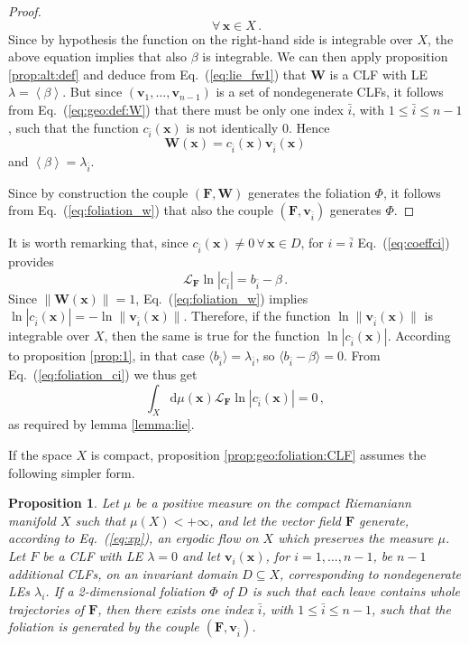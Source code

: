 \documentclass{article}
\theoremstyle{plain}
\newtheorem{proposition}[theorem]{Proposition}
\theoremstyle{definition}
\theoremstyle{remark}
\newcommand{\vect}[1]{\boldsymbol{#1}}
\begin{document}
\begin{proof}
\begin{equation}
\ \forall\, \vect{x}\in X\,.
\end{equation}
Since by hypothesis the function on the right-hand side
is integrable over $X$, the above equation
implies that also $\beta$ is integrable. We can then apply proposition
\ref{prop:alt:def} and deduce from Eq.~(\ref{eq:lie_fw1}) that
$\vect{W}$ is a CLF with LE $\lambda=\left<\beta\right>$. But since 
$\left(\vect{v}_1, \dots, \vect{v}_{n-1}\right)$ is a
set of nondegenerate CLFs, it follows from Eq.~(\ref{eq:geo:def:W})
that there must be only one index $\bar i$,
with $1\leq \bar i\leq n-1$, such that the function $c_{\bar i} (\vect{x})$
is not identically 0. Hence 
\begin{equation} \label{eq:foliation_w}
    \vect{W}(\vect{x}) = c_{\bar i} (\vect{x})
\vect{v}_{\bar i} (\vect{x})
  \end{equation}
and $\left<\beta\right>=\lambda_{\bar i}$. 

Since by construction the couple $(\vect{F},\vect{W})$ generates the
foliation $\Phi$, it follows from Eq.~(\ref{eq:foliation_w}) that
also the couple $(\vect{F},\vect{v}_{\bar i})$ generates $\Phi$.
\end{proof}

It is worth remarking that,
since $c_{\bar i} (\vect{x})\neq 0\,\forall\,\vect x\in D$, for $i=\bar i$
Eq.~(\ref{eq:coeffci}) provides
 \begin{equation}\label{eq:foliation_ci}
  \mathcal{L}_{\vect{F}}\ln |c_{\bar i}|=b_{\bar i}-\beta\,.
  \end{equation}
Since $\lVert \vect{W}(\vect{x})\rVert =1$,
Eq.~(\ref{eq:foliation_w}) implies $\ln|c_{\bar i}(\vect{x})|=
-\ln \lVert \vect{v}_{\bar i}(\vect{x})\rVert$. Therefore, 
if the function $\ln \lVert \vect{v}_{\bar i}(\vect{x})\rVert$ is integrable 
over $X$, then the same is true for the function $\ln|c_{\bar i}(\vect{x})|$.
According to proposition \ref{prop:1}, in that case
$\langle b_{\bar i}\rangle=\lambda_{\bar i}$, so 
$\langle b_{\bar i}-\beta\rangle=0$. From
Eq.~(\ref{eq:foliation_ci}) we thus get
\[
\int_X \mathrm{d}\mu(\vect{x}) \mathcal{L}_{\vect{F}}
\ln |c_{\bar i}(\vect{x})|=0\,,
\]
as required by lemma \ref{lemma:lie}.

If the space $X$ is compact, proposition \ref{prop:geo:foliation:CLF}
assumes the following simpler form.

\begin{proposition} \label{prop:geo:foliation:CLF2}
Let $\mu$ be a positive measure on the compact Riemaniann manifold $X$
such that $\mu(X)<+\infty$, and
let the vector field $\vect{F}$ generate, according to Eq.~(\ref{eq:xp}), 
an ergodic flow on $X$ which preserves the measure $\mu$.
Let $F$ be a CLF with LE $\lambda=0$ and let
  $\vect{v}_i(\vect{x})$, for $i=1, \dots, n-1$, 
be $n-1$ additional CLFs, on an invariant domain
  $D\subseteq X$, corresponding to nondegenerate LEs $\lambda_i$.
  If a 2-dimensional foliation $\Phi$ of $D$ is such that each leave contains whole
  trajectories of $\vect{F}$, then there exists one index $\bar i$,
with $1\leq \bar i\leq n-1$, such that the foliation is generated by 
the couple $(\vect{F},\vect{v}_{\bar i})$.
\end{proposition}
\end{document}
